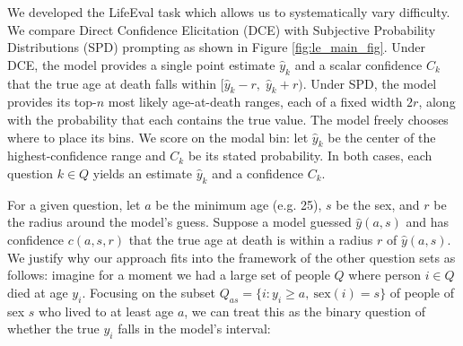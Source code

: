 
We developed the LifeEval task which allows us to systematically vary difficulty. We compare Direct Confidence Elicitation (DCE) with Subjective Probability Distributions (SPD) prompting as shown in Figure \ref{fig:le_main_fig}.
Under DCE, the model provides a single point estimate $\hat{y}_k$ and a scalar confidence $C_k$ that the true age at death falls within $[\hat{y}_k - r,\; \hat{y}_k + r)$. Under SPD, the model provides its top-$n$ most likely age-at-death ranges, each of a fixed width $2r$, along with the probability that each contains the true value. The model freely chooses where to place its bins. We score on the modal bin: let $\hat{y}_k$ be the center of the highest-confidence range and $C_k$ be its stated probability. In both cases, each question $k \in Q$ yields an estimate $\hat{y}_k$ and a confidence $C_k$.

For a given question, let $a$ be the minimum age (e.g. 25), $s$ be the sex, and $r$ be the radius around the model's guess. Suppose a model guessed $\hat{y}(a,s)$ and has confidence $c(a,s,r)$ that the true age at death is within a radius $r$ of $\hat{y}(a,s)$. We justify why our approach fits into the framework of the other question sets as follows: imagine for a moment we had a large set of people $Q$ where person $i\in Q$ died at age $y_i$. Focusing on the subset $Q_{as}=\{i: y_i\ge a,\ \text{sex}(i)=s\}$ of people of sex $s$ who lived to at least age $a$, we can treat this as the binary question of whether the true $y_i$ falls in the model's interval:

